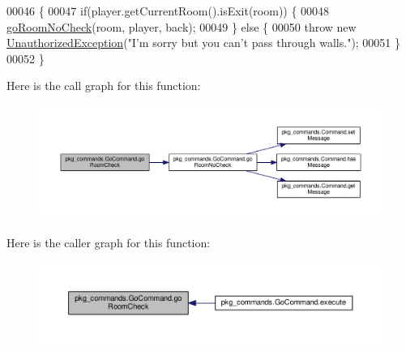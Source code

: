 \begin{DoxyCode}
00046                                                                                                            
                                       \{
00047         \textcolor{keywordflow}{if}(player.getCurrentRoom().isExit(room)) \{
00048             \hyperlink{classpkg__commands_1_1GoCommand_a210afbc5f3ef34d3ad5759d853c8f8c2}{goRoomNoCheck}(room, player, back);
00049         \} \textcolor{keywordflow}{else} \{
00050             \textcolor{keywordflow}{throw} \textcolor{keyword}{new} \hyperlink{classpkg__exceptions_1_1UnauthorizedException}{UnauthorizedException}(\textcolor{stringliteral}{"I'm sorry but you can't pass through
       walls."});
00051         \}
00052     \}
\end{DoxyCode}


Here is the call graph for this function\-:
\nopagebreak
\begin{figure}[H]
\begin{center}
\leavevmode
\includegraphics[width=350pt]{classpkg__commands_1_1GoCommand_acbf1aa81fa5b1aef7cafb8b4e3ace3a9_cgraph}
\end{center}
\end{figure}




Here is the caller graph for this function\-:
\nopagebreak
\begin{figure}[H]
\begin{center}
\leavevmode
\includegraphics[width=350pt]{classpkg__commands_1_1GoCommand_acbf1aa81fa5b1aef7cafb8b4e3ace3a9_icgraph}
\end{center}
\end{figure}


